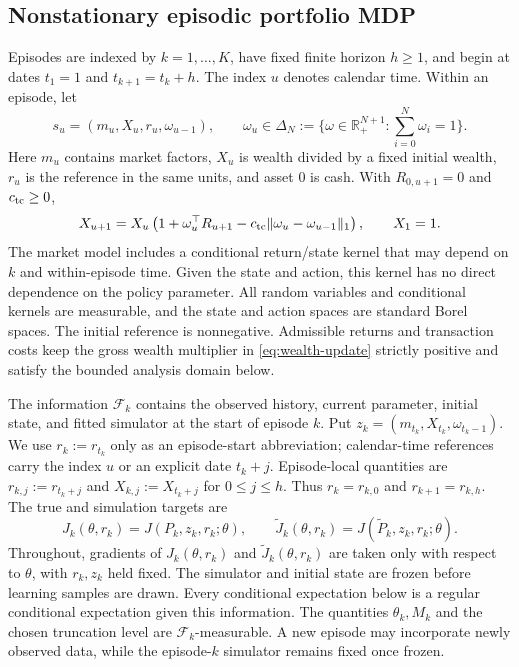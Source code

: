 \documentclass[11pt]{article}
\newcommand{\R}{\mathbb R}
\newcommand{\1}{\mathbf 1}
\DeclarePairedDelimiter{\norm}{\lVert}{\rVert}
\newcommand{\cF}{\mathcal F}
\begin{document}
\subsection{Nonstationary episodic portfolio MDP}
Episodes are indexed by $k=1,\ldots,K$, have fixed finite horizon $h\ge1$, and begin at dates $t_1=1$ and $t_{k+1}=t_k+h$. The index $u$ denotes calendar time. Within an episode, let
\[
 s_u=(m_u,X_u,r_u,\omega_{u-1}),\qquad
 \omega_u\in\Delta_N:=\{\omega\in\R_+^{N+1}:\textstyle\sum_{i=0}^N\omega_i=1\}.
\]
Here $m_u$ contains market factors, $X_u$ is wealth divided by a fixed initial wealth, $r_u$ is the reference in the same units, and asset $0$ is cash. With $R_{0,u+1}=0$ and $c_{\rm tc}\ge0$,
\begin{equation}\label{eq:wealth-update}
 X_{u+1}=X_u\left(1+\omega_u^\top R_{u+1}
 -c_{\rm tc}\norm{\omega_u-\omega_{u-1}}_1\right),\qquad X_1=1.
\end{equation}
The market model includes a conditional return/state kernel that may depend on $k$ and within-episode time. Given the state and action, this kernel has no direct dependence on the policy parameter. All random variables and conditional kernels are measurable, and the state and action spaces are standard Borel spaces. The initial reference is nonnegative. Admissible returns and transaction costs keep the gross wealth multiplier in \eqref{eq:wealth-update} strictly positive and satisfy the bounded analysis domain below.

The information $\cF_k$ contains the observed history, current parameter, initial state, and fitted simulator at the start of episode $k$. Put $z_k=(m_{t_k},X_{t_k},\omega_{t_k-1})$. We use $r_k:=r_{t_k}$ only as an episode-start abbreviation; calendar-time references carry the index $u$ or an explicit date $t_k+j$. Episode-local quantities are $r_{k,j}:=r_{t_k+j}$ and $X_{k,j}:=X_{t_k+j}$ for $0\le j\le h$. Thus $r_k=r_{k,0}$ and $r_{k+1}=r_{k,h}$. The true and simulation targets are
\begin{equation}\label{eq:conditional-targets}
 J_k(\theta,r_{k})=J(P_k,z_k,r_k;\theta),\qquad
 \widetilde J_k(\theta,r_{k})=J(\widetilde P_k,z_k,r_k;\theta).
\end{equation}
Throughout, gradients of $J_k(\theta,r_k)$ and $\widetilde J_k(\theta,r_k)$ are taken only with respect to $\theta$, with $r_k,z_k$ held fixed. The simulator and initial state are frozen before learning samples are drawn. Every conditional expectation below is a regular conditional expectation given this information. The quantities $\theta_k,M_k$ and the chosen truncation level are $\cF_k$-measurable. A new episode may incorporate newly observed data, while the episode-$k$ simulator remains fixed once frozen.
\end{document}
